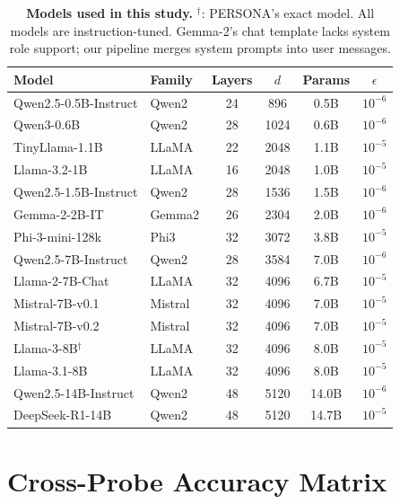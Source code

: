 \documentclass{article}
\begin{document}
\begin{table}[h]
\caption{\textbf{Models used in this study.} $^\dagger$: PERSONA's exact model. All models are instruction-tuned. Gemma-2's chat template lacks system role support; our pipeline merges system prompts into user messages.}
\centering
\small
\begin{tabular}{llcccc}
\toprule
\textbf{Model} & \textbf{Family} & \textbf{Layers} & $d$ & \textbf{Params} & $\epsilon$ \\
\midrule
Qwen2.5-0.5B-Instruct & Qwen2 & 24 & 896 & 0.5B & $10^{-6}$ \\
Qwen3-0.6B & Qwen2 & 28 & 1024 & 0.6B & $10^{-6}$ \\
TinyLlama-1.1B & LLaMA & 22 & 2048 & 1.1B & $10^{-5}$ \\
Llama-3.2-1B & LLaMA & 16 & 2048 & 1.0B & $10^{-5}$ \\
Qwen2.5-1.5B-Instruct & Qwen2 & 28 & 1536 & 1.5B & $10^{-6}$ \\
Gemma-2-2B-IT & Gemma2 & 26 & 2304 & 2.0B & $10^{-6}$ \\
Phi-3-mini-128k & Phi3 & 32 & 3072 & 3.8B & $10^{-5}$ \\
Qwen2.5-7B-Instruct & Qwen2 & 28 & 3584 & 7.0B & $10^{-6}$ \\
Llama-2-7B-Chat & LLaMA & 32 & 4096 & 6.7B & $10^{-5}$ \\
Mistral-7B-v0.1 & Mistral & 32 & 4096 & 7.0B & $10^{-5}$ \\
Mistral-7B-v0.2 & Mistral & 32 & 4096 & 7.0B & $10^{-5}$ \\
Llama-3-8B$^\dagger$ & LLaMA & 32 & 4096 & 8.0B & $10^{-5}$ \\
Llama-3.1-8B & LLaMA & 32 & 4096 & 8.0B & $10^{-5}$ \\
Qwen2.5-14B-Instruct & Qwen2 & 48 & 5120 & 14.0B & $10^{-6}$ \\
DeepSeek-R1-14B & Qwen2 & 48 & 5120 & 14.7B & $10^{-5}$ \\
\bottomrule
\end{tabular}
\end{table}

\section{Cross-Probe Accuracy Matrix}\label{app:cross_probe_detail}
\end{document}
